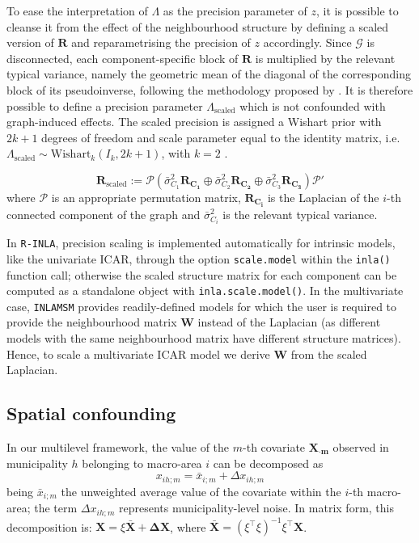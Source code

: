 \documentclass{book}
\begin{document}
To ease the interpretation of $\Lambda$ as the precision parameter of $z$, it is possible to cleanse it from the effect of the neighbourhood structure by defining a scaled version of $\mathbf{R}$ \cite{Sorbye} and reparametrising the precision of $z$ accordingly.
Since $\mathcal{G}$ is disconnected, each component-specific block of $\mathbf{R}$ is multiplied by the relevant typical variance, namely the geometric mean of the diagonal of the corresponding block of its pseudoinverse, following the methodology proposed by \cite{Freni}. It is therefore possible to define a precision parameter $\Lambda_\mathrm{scaled}$ which is not confounded with graph-induced effects. The scaled precision is assigned a Wishart prior \citep{Gelman} with $2k+1$ degrees of freedom and scale parameter equal to the identity matrix, i.e. $\Lambda_\mathrm{scaled} \sim \mathrm{Wishart}_{k}( I_k, 2k+1)$, with $k=2$ \citep{INLAMSM}.


$$
\mathbf{R}_\mathrm{scaled} := \mathcal{P} \left( \bar{\sigma}_{C_1}^2 \mathbf{R_{C_1}} \oplus \bar{\sigma}_{C_2}^2 \mathbf{R_{C_2}}  
\oplus \bar{\sigma}_{C_3}^2 \mathbf{R_{C_3}} \right) \mathcal{P'}
$$
where $\mathcal{P}$ is an appropriate permutation matrix, $\mathbf{R_{C_i}}$ is the Laplacian of the $i$-th connected component of the graph and $\bar{\sigma}_{C_i}^2$ is the relevant typical variance. 



In \texttt{R-INLA}, precision scaling is implemented automatically for intrinsic models, like the univariate ICAR, through the option \texttt{scale.model} within the \texttt{inla()} function call; otherwise the scaled structure matrix for each component can be computed as a standalone object with \texttt{inla.scale.model()}. In the multivariate case, \texttt{INLAMSM} provides readily-defined models for which the user is required to provide the neighbourhood matrix $\mathbf{W}$ instead of the Laplacian (as different models with the same neighbourhood matrix have different structure matrices). Hence, to scale a multivariate ICAR model we derive $\mathbf{W}$ from the scaled Laplacian.

\subsection{Spatial confounding}


In our multilevel framework, the value of the $m$-th covariate $\mathbf{X_{\cdot m}}$ observed in municipality $h$ belonging to macro-area $i$ can be decomposed as
$$
x_{ih;m} = \bar{x}_{i;m} + \Delta x_{ih;m}
$$
being $\bar{x}_{i;m}$ the unweighted average value of the covariate within the $i$-th macro-area; the term $\Delta x_{ih;m}$ represents municipality-level noise. In matrix form, this decomposition is: $\mathbf{X}= \xi \bar{\mathbf{X}} + \mathbf{\Delta X}$, where $\bar{\mathbf{X}} = (\xi ^{\top} \xi)^{-1} \xi^{\top} \mathbf{X}$.
\end{document}
